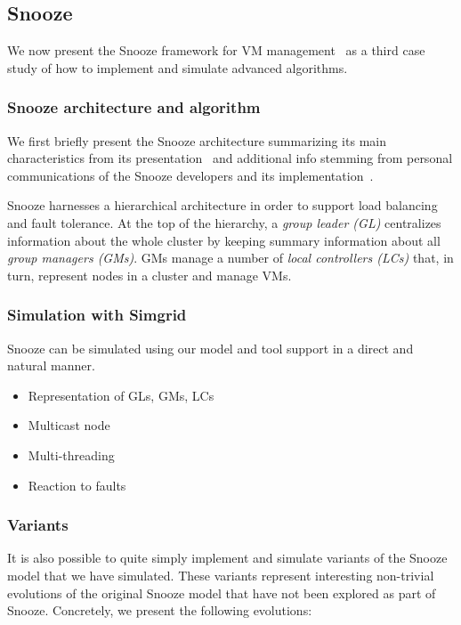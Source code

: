 \subsection{Snooze}
\label{subsec:snooze}


We now present the Snooze framework for VM
management~\cite{feller:ccgrid12} as a third case study of how
to implement and simulate advanced algorithms.

\subsubsection{Snooze architecture and  algorithm}

We first briefly present the Snooze architecture summarizing its main
characteristics from its presentation~\cite{feller:ccgrid12} and
additional info stemming from personal communications of the Snooze
developers and its implementation~\cite{snoozedev14,snoozeweb}.

Snooze harnesses a hierarchical architecture in order to support load
balancing and fault tolerance. At the top of the hierarchy, a
\emph{group leader (GL)} centralizes information about the whole
cluster by keeping summary information about all \emph{group managers
  (GMs)}. GMs manage a number of \emph{local controllers (LCs)} that,
in turn, represent nodes in a cluster and manage VMs.


\subsubsection{Simulation with Simgrid}

Snooze can be simulated using our model and tool support in a direct
and natural manner.

\begin{itemize}
  \item Representation of GLs, GMs, LCs
  \item Multicast node
  \item Multi-threading
  \item Reaction to faults
\end{itemize}

\subsubsection{Variants}

It is also possible to quite simply implement and simulate variants of
the Snooze model that we have simulated. These variants represent
interesting non-trivial evolutions of the original Snooze model that
have not been explored as part of Snooze. Concretely, we present the
following evolutions:

